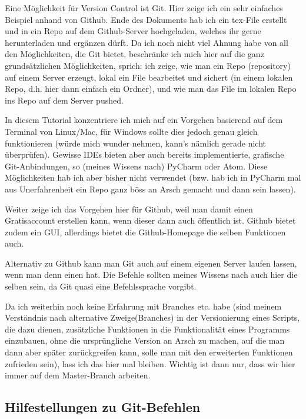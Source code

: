 \documentclass[twoside, 11pr]{article}
\begin{document}
Eine Möglichkeit für Version Control ist Git. Hier zeige ich ein sehr einfaches Beispiel anhand von Github. Ende des Dokuments hab ich ein tex-File erstellt und in ein Repo auf dem Github-Server hochgeladen, welches ihr gerne herunterladen und ergänzen dürft. Da ich noch nicht viel Ahnung habe von all den Möglichkeiten, die Git bietet, beschränke ich mich hier auf die ganz grundsätzlichen Möglichkeiten, sprich: ich zeige, wie man ein Repo (repository) auf einem Server erzeugt, lokal ein File bearbeitet und sichert (in einem lokalen Repo, d.h. hier dann einfach ein Ordner), und wie man das File im lokalen Repo ins Repo auf dem Server pushed. \par
In diesem Tutorial konzentriere ich mich auf ein Vorgehen basierend auf dem Terminal von Linux/Mac, für Windows sollte dies jedoch genau gleich funktionieren (würde mich wunder nehmen, kann's nämlich gerade nicht überprüfen). Gewisse IDEs bieten aber auch bereits implementierte, grafische Git-Anbindungen, so (meines Wissens nach) PyCharm oder Atom. Diese Möglichkeiten hab ich aber bisher nicht verwendet (bzw. hab ich in PyCharm mal aus Unerfahrenheit ein Repo ganz böss an Arsch gemacht und dann sein lassen).\par
Weiter zeige ich das Vorgehen hier für Github, weil man damit einen Gratisaccount erstellen kann, wenn dieser dann auch öffentlich ist. Github bietet zudem ein GUI, allerdings bietet die Github-Homepage die selben Funktionen auch. \par
Alternativ zu Github kann man Git auch auf einem eigenen Server laufen lassen, wenn man denn einen hat. Die Befehle sollten meines Wissens nach auch hier die selben sein, da Git quasi eine Befehlssprache vorgibt.
\newline
\par
Da ich weiterhin noch keine Erfahrung mit Branches etc. habe (sind meinem Verständnis nach alternative \glqq Zweige\grqq (Branches) in der Versionierung eines Scripts, die dazu dienen, zusätzliche Funktionen in die Funktionalität eines Programms einzubauen, ohne die ursprüngliche Version an Arsch zu machen, auf die man dann aber später zurückgreifen kann, solle man mit den erweiterten Funktionen zufrieden sein), lass ich das hier mal bleiben. Wichtig ist dann nur, dass wir hier immer auf dem Master-Branch arbeiten.

\subsection{Hilfestellungen zu Git-Befehlen}
\end{document}
